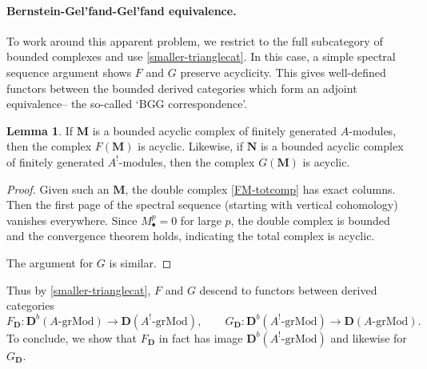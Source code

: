 \documentclass[a4paper]{article}
\theoremstyle{definition}
\newtheorem{lemma}[defn]{Lemma}
\theoremstyle{remark}
\newcommand{\grMod}{\ensuremath{\text{-grMod}}}
\newcommand{\deri}{\mathbf{D}}
\begin{document}
\paragraph{Bernstein-Gel'fand-Gel'fand equivalence.} To work around this apparent
problem, we restrict to the full subcategory of bounded complexes and use
\cref{smaller-trianglecat}. In this case, a simple spectral sequence argument
shows \(F\) and \(G\) preserve acyclicity. This gives well-defined functors
between the bounded derived categories which form an adjoint equivalence-- the
so-called `BGG correspondence'.

\begin{lemma}
    If \(\mathbf{M}\) is a bounded acyclic complex of finitely generated
    \(A\)-modules, then the complex \(F(\mathbf{M})\) is acyclic. Likewise, if
    \(\mathbf{N}\) is a bounded acyclic complex of finitely generated
    \(A^!\)-modules, then the complex \(G(\mathbf{M})\) is acyclic.
    \begin{proof}
        Given such an \(\mathbf{M}\), the double complex \eqref{FM-totcomp} has
        exact columns.  Then the first page of the spectral sequence (starting
        with vertical cohomology) vanishes everywhere. Since \(M^p_\bullet = 0\)
        for large \(p\), the double complex is bounded and the convergence
        theorem holds, indicating the total complex is acyclic.
         
        The argument for \(G\) is similar.
    \end{proof}
\end{lemma}

Thus by \cref{smaller-trianglecat}, \(F\) and
\(G\) descend to functors between derived categories 
\[{F_\deri: \deri^b(A\grMod)\rightarrow \deri(A^!\grMod)}, \qquad G_\deri:
\deri^b(A^!\grMod) \rightarrow \deri(A\grMod).\] 
To conclude, we show that \(F_\deri\) in fact has image \(\deri^b(A^!\grMod)\)
and likewise for \(G_\deri\).
\pagebreak
\end{document}
